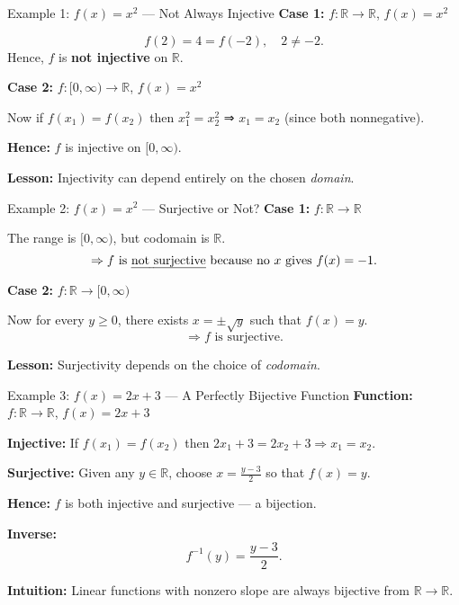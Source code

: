 \documentclass[11pt]{beamer}
\theoremstyle{plain}
\begin{document}
\begin{frame}{Example 1: $f(x) = x^2$ — Not Always Injective}
\textbf{Case 1:} $f: \mathbb{R} \to \mathbb{R}$, $f(x) = x^2$

\[
f(2) = 4 = f(-2), \quad 2 \neq -2.
\]
Hence, $f$ is \textbf{not injective} on $\mathbb{R}$.

\medskip
\textbf{Case 2:} $f: [0, \infty) \to \mathbb{R}$, $f(x) = x^2$

Now if $f(x_1) = f(x_2)$ then $x_1^2 = x_2^2$ ⇒ $x_1 = x_2$ (since both nonnegative).

\textbf{Hence:} $f$ is injective on $[0,\infty)$.

\medskip
\textbf{Lesson:}  
Injectivity can depend entirely on the chosen \emph{domain}.
\end{frame}

\begin{frame}{Example 2: $f(x) = x^2$ — Surjective or Not?}
\textbf{Case 1:} $f: \mathbb{R} \to \mathbb{R}$

The range is $[0,\infty)$, but codomain is $\mathbb{R}$.  
\[
\Rightarrow \text{$f$ is \emph{not surjective}} \text{ because no $x$ gives } f(x) = -1.
\]

\medskip
\textbf{Case 2:} $f: \mathbb{R} \to [0,\infty)$

Now for every $y \ge 0$, there exists $x = \pm \sqrt{y}$ such that $f(x)=y$.  
\[
\Rightarrow \text{$f$ is surjective.}
\]

\medskip
\textbf{Lesson:}  
Surjectivity depends on the choice of \emph{codomain}.
\end{frame}

\begin{frame}{Example 3: $f(x) = 2x + 3$ — A Perfectly Bijective Function}
\textbf{Function:} $f: \mathbb{R} \to \mathbb{R}$, $f(x) = 2x + 3$

\textbf{Injective:}
If $f(x_1) = f(x_2)$ then $2x_1 + 3 = 2x_2 + 3 \Rightarrow x_1 = x_2.$

\textbf{Surjective:}
Given any $y \in \mathbb{R}$, choose $x = \frac{y - 3}{2}$ so that $f(x) = y$.

\textbf{Hence:} $f$ is both injective and surjective — a bijection.

\medskip
\textbf{Inverse:}
\[
f^{-1}(y) = \frac{y - 3}{2}.
\]

\textbf{Intuition:}  
Linear functions with nonzero slope are always bijective from $\mathbb{R} \to \mathbb{R}$.
\end{frame}
\end{document}
